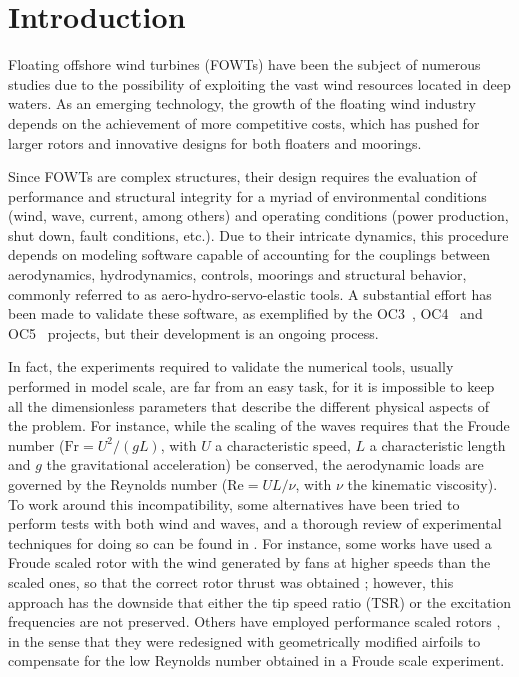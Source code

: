 \section{Introduction} \label{sec:introduction}
Floating offshore wind turbines (FOWTs) have been the subject of numerous studies due to the possibility of exploiting the vast wind resources located in deep waters. As an emerging technology, the growth of the floating wind industry depends on the achievement of more competitive costs, which has pushed for larger rotors and innovative designs for both floaters and moorings.

Since FOWTs are complex structures, their design requires the evaluation of performance and structural integrity for a myriad of environmental conditions (wind, wave, current, among others) and operating conditions (power production, shut down, fault conditions, etc.). Due to their intricate dynamics, this procedure depends on modeling software capable of accounting for the couplings between aerodynamics, hydrodynamics, controls, moorings and structural behavior, commonly referred to as aero-hydro-servo-elastic tools. A substantial effort has been made to validate these software, as exemplified by the OC3~\citep{jonkman2010report}, OC4~\citep{OC42014} and OC5~\citep{OC52017} projects, but their development is an ongoing process.

In fact, the experiments required to validate the numerical tools, usually performed in model scale, are far from an easy task, for it is impossible to keep all the dimensionless parameters that describe the different physical aspects of the problem. For instance, while the scaling of the waves requires that the Froude number ($\textrm{Fr} = U^{2}/(gL)$, with $U$ a characteristic speed, $L$ a characteristic length and $g$ the gravitational acceleration) be conserved, the aerodynamic loads are governed by the Reynolds number ($\textrm{Re} = UL/\nu$, with $\nu$ the kinematic viscosity). To work around this incompatibility, some alternatives have been tried to perform tests with both wind and waves, and a thorough review of experimental techniques for doing so can be found in \citet{otter2022review}. For instance, some works have used a Froude scaled rotor with  the wind generated by fans at higher speeds than the scaled ones, so that the correct rotor thrust was obtained \citep{martin2014methodology, skaare2007integrated, mortensen2018experimental}; however, this approach has the downside that either the tip speed ratio (TSR) or the excitation frequencies are not preserved. Others have employed performance scaled rotors \citep{goupee2014experimental, de2014development, bredmose2017triple}, in the sense that they were redesigned with geometrically modified airfoils to compensate for the low Reynolds number obtained in a Froude scale experiment. 

